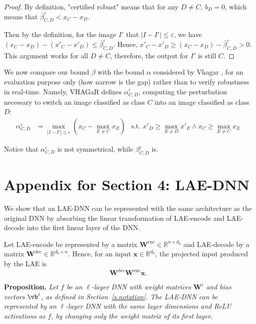 \begin{proof}[Proof] By definition, "certified robust" means that for any $D\neq C$, $b_D = 0$, which means that $\bar{\beta}^{\varepsilon}_{C,D} < x_C - x_D$. 

Then by the definition, for the image $I'$ that $|I - I'|\leq \varepsilon$, we have $(x_C-x_D) - (x'_C-x'_D)\leq \bar{\beta}^{\varepsilon}_{C,D}$. Hence, $x'_C-x'_D\geq (x_C-x_D)-\bar{\beta}^{\varepsilon}_{C,D}> 0$. This argument works for all $D\neq C$, therefore, the output for $I'$ is still $C$.
\end{proof}

We now compare our bound $\beta$ with the bound $\alpha$ considered by Vhagar \cite{vhagar}, for an evaluation purpose only (how narrow is the gap) rather than to verify robustness in real-time. 
Namely, VHAGaR \cite{vhagar} defines $\alpha^{\varepsilon}_{C,D}$, computing the perturbation necessary to switch an image classified as class $C$ into an image classified as class $D$:
\begin{align*}
	\alpha^{\varepsilon}_{C,D} &= \max_{|I-I'| \leq \varepsilon} (x_C-\max_{E\neq C}x_E) &\text{s.t. }  x'_D \geq \max_{E\neq D}x'_E \wedge x_C \geq \max_{E\neq C}x_E 
\end{align*}

Notice that  
$\alpha^{\varepsilon}_{C,D}$ is not symmetrical, while 
$\beta^{\varepsilon}_{C,D}$ is.


\section{Appendix for Section 4: LAE-DNN}
\label{app.lae.folding}

We show that an LAE-DNN can be represented with the same architecture
as the original DNN by absorbing the linear transformation of
LAE-encode and LAE-decode into the first linear layer of the DNN.

Let LAE-encode be represented by a matrix
$\boldsymbol{W}^{\mathrm{enc}}\in\mathbb{R}^{n\times d_0}$ and
LAE-decode by a matrix
$\boldsymbol{W}^{\mathrm{dec}}\in\mathbb{R}^{d_0\times n}$.
Hence, for an input $\boldsymbol{x}\in\mathbb{R}^{d_0}$, the projected
input produced by the LAE is
\[
\boldsymbol{W}^{\mathrm{dec}}
\boldsymbol{W}^{\mathrm{enc}}\boldsymbol{x}.
\]

\noindent\textbf{Proposition.}
\emph{Let $f$ be an $\ell$-layer DNN with weight matrices
	$\boldsymbol{W}^i$ and bias vectors $\vb^i$, as defined in
	Section~\ref{s.notation}. The LAE-DNN can be represented by an
	$\ell$-layer DNN with the same layer dimensions and ReLU activations
	as $f$, by changing only the weight matrix of its first layer.}


